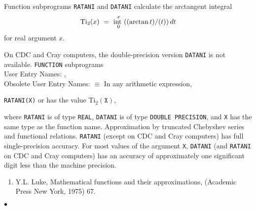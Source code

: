                          
                   
\Submitter{}                              
                         
Function subprograms {\tt RATANI} and {\tt DATANI} calculate
the arctangent integral
$$ \mbox{\rm Ti}_2(x) \ = \ \int_0^x\frac{\arctan t}{t}\,dt $$
for real argument $x$.
\par
On CDC and Cray computers, the double-precision version
{\tt DATANI} is not available.
\Structure
{\tt FUNCTION} subprograms\\
User Entry Names: ,  \\
Obsolete User Entry Names:  $\equiv$ 
\Usage
In any arithmetic expression,
\begin{center}
{\tt RATANI(X)} \quad or  \quad has the value \quad
Ti$_2(\mathtt{X})$,
\end{center}
where {\tt RATANI} is of type {\tt REAL},
{\tt DATANI} is of type {\tt DOUBLE
PRECISION}, and {\tt X} has the same type as the function name.
\Method
Approximation by truncated Chebyshev series and functional relations.
\Accuracy
{\tt RATANI} (except on CDC and Cray computers)
has full single-precision accuracy.
For most values of the argument {\tt X}, {\tt DATANI}
(and {\tt RATANI} on CDC and Cray computers) has an accuracy of
approximately one significant digit less than the machine precision.
\Refer
\begin{enumerate}
\item Y.L. Luke, Mathematical functions and their
approximations, (Academic Press New York, 1975) 67.
\end{enumerate}
$\bullet$
